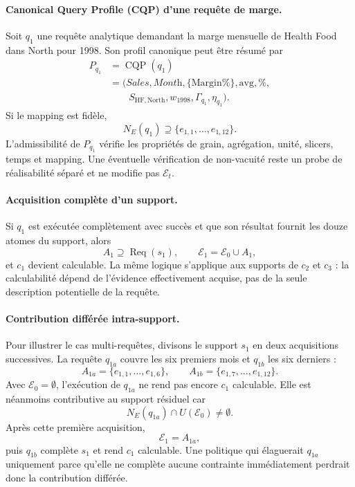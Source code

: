 \paragraph*{Canonical Query Profile (CQP) d'une requête de marge.}
Soit $q_1$ une requête analytique demandant la marge mensuelle de Health Food dans North pour 1998. Son profil canonique peut être résumé par
{\scriptsize
\[
\begin{aligned}
P_{q_1}&=\operatorname{CQP}(q_1)\\[-0.5mm]
&=(\textit{Sales},\textit{Month},\{\mathrm{Margin\%}\},\mathrm{avg},\%,\\[-0.5mm]
&\qquad S_{\mathrm{HF,North}},w_{1998},\Gamma_{q_1},\eta_{q_1}).
\end{aligned}
\]
}
Si le mapping est fidèle,
\[
N_E(q_1)\supseteq\{e_{1,1},\ldots,e_{1,12}\}.
\]
L'admissibilité de $P_{q_1}$ vérifie les propriétés de grain, agrégation, unité, slicers, temps et mapping. Une éventuelle vérification de non-vacuité reste un probe de réalisabilité séparé et ne modifie pas $\mathcal{E}_t$.

\paragraph*{Acquisition complète d'un support.}
Si $q_1$ est exécutée complètement avec succès et que son résultat fournit les douze atomes du support, alors
\[
A_1\supseteq\operatorname{Req}(s_1),
\qquad
\mathcal{E}_1=\mathcal{E}_0\cup A_1,
\]
et $c_1$ devient calculable. La même logique s'applique aux supports de $c_2$ et $c_3$ : la calculabilité dépend de l'évidence effectivement acquise, pas de la seule description potentielle de la requête.

\paragraph*{Contribution différée intra-support.}
Pour illustrer le cas multi-requêtes, divisons le support $s_1$ en deux acquisitions successives. La requête $q_{1a}$ couvre les six premiers mois et $q_{1b}$ les six derniers :
\[
A_{1a}=\{e_{1,1},\ldots,e_{1,6}\},
\qquad
A_{1b}=\{e_{1,7},\ldots,e_{1,12}\}.
\]
Avec $\mathcal{E}_0=\emptyset$, l'exécution de $q_{1a}$ ne rend pas encore $c_1$ calculable. Elle est néanmoins contributive au support résiduel car
\[
N_E(q_{1a})\cap U(\mathcal{E}_0)\neq\emptyset.
\]
Après cette première acquisition,
\[
\mathcal{E}_1=A_{1a},
\]
puis $q_{1b}$ complète $s_1$ et rend $c_1$ calculable. Une politique qui élaguerait $q_{1a}$ uniquement parce qu'elle ne complète aucune contrainte immédiatement perdrait donc la contribution différée.

